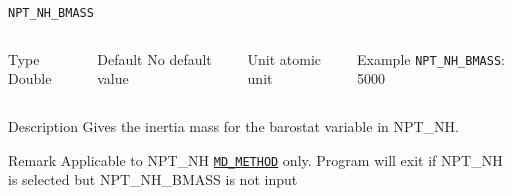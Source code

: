 \begin{frame}[allowframebreaks]{\texttt{NPT\_NH\_BMASS}} \label{NPT_NH_BMASS}
\vspace*{-12pt}
\begin{columns}
\begin{block}{Type}
Double
\end{block}

\begin{block}{Default}
No default value
\end{block}

\begin{block}{Unit}
atomic unit
\end{block}

\begin{block}{Example}
\texttt{NPT\_NH\_BMASS}: 5000
\end{block}
\end{columns}

\begin{block}{Description}
Gives the inertia mass for the barostat variable in NPT\_NH.
\end{block}

\begin{block}{Remark}
Applicable to NPT\_NH \hyperlink{MD_METHOD}{\texttt{MD\_METHOD}} only.
Program will exit if NPT\_NH is selected but NPT\_NH\_BMASS is not input
\end{block}

\end{frame}



